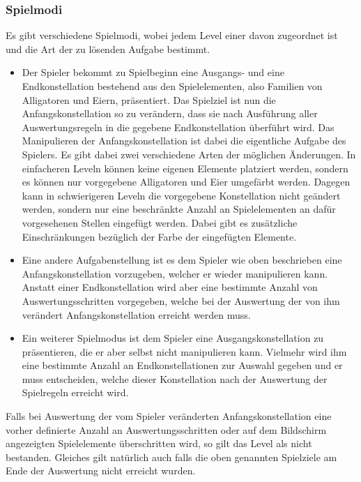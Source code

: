 \subsubsection{Spielmodi}
Es gibt verschiedene Spielmodi, wobei jedem Level einer davon zugeordnet ist und die Art der zu lösenden Aufgabe bestimmt.
	\begin{itemize}
		\item Der Spieler bekommt zu Spielbeginn eine Ausgangs- und eine Endkonstellation bestehend aus den Spielelementen, also Familien von Alligatoren und Eiern, präsentiert.
		Das Spielziel ist nun die Anfangskonstellation so zu verändern, dass sie nach Ausführung aller Auswertungsregeln in die gegebene Endkonstellation überführt wird.
		Das Manipulieren der Anfangskonstellation ist dabei die eigentliche Aufgabe des Spielers.
		Es gibt dabei zwei verschiedene Arten der möglichen Änderungen.
		In einfacheren Leveln können keine eigenen Elemente platziert werden, sondern es können nur vorgegebene Alligatoren und Eier umgefärbt werden.
		Dagegen kann in schwierigeren Leveln die vorgegebene Konstellation nicht geändert werden, sondern nur eine beschränkte Anzahl an Spielelementen an dafür vorgesehenen Stellen eingefügt werden.
		Dabei gibt es zusätzliche Einschränkungen bezüglich der Farbe der eingefügten Elemente.

		\item Eine andere Aufgabenstellung ist es dem Spieler wie oben beschrieben eine Anfangskonstellation vorzugeben, welcher er wieder manipulieren kann.
		Anstatt einer Endkonstellation wird aber eine bestimmte Anzahl von Auswertungsschritten vorgegeben, welche bei der Auswertung der von ihm verändert Anfangskonstellation erreicht werden muss.

		\item Ein weiterer Spielmodus ist dem Spieler eine Ausgangskonstellation zu präsentieren, die er aber selbst nicht manipulieren kann.
		Vielmehr wird ihm eine bestimmte Anzahl an Endkonstellationen zur Auswahl gegeben und er muss entscheiden, welche dieser Konstellation nach der Auswertung der Spielregeln erreicht wird.

	\end{itemize}

	Falls bei Auswertung der vom Spieler veränderten Anfangskonstellation eine vorher definierte Anzahl an Auswertungsschritten oder auf dem Bildschirm angezeigten Spielelemente überschritten wird, so gilt das Level als nicht bestanden.
	Gleiches gilt natürlich auch falls die oben genannten Spielziele am Ende der Auswertung nicht erreicht wurden.


